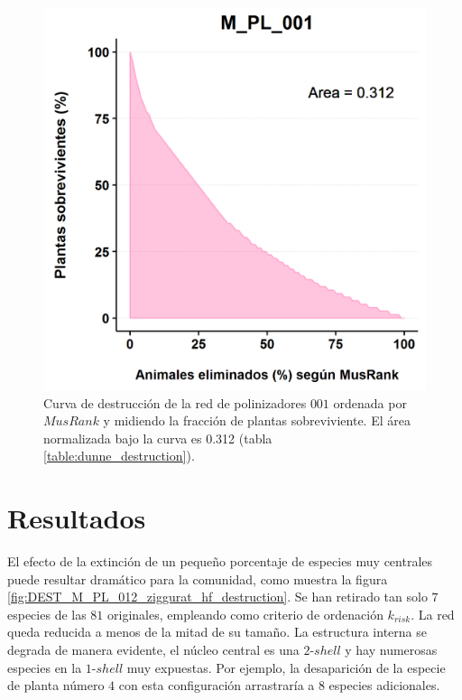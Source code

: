 \begin{figure}[h!]
\centering
\includegraphics[scale=1]{Figures/DEST_M_PL_001_MRdunne_extinction_plot.png}
\caption{Curva de destrucción de la red de polinizadores $001$ ordenada por $MusRank$ y midiendo la fracción de plantas sobreviviente. El área normalizada bajo la curva es 0.312 (tabla \ref{table:dunne_destruction}).}
\label{fig:DEST_M_PL_001_MRdunne_extinction_plot}
\end{figure}

\section{Resultados}

El efecto de la extinción de un pequeño porcentaje de especies muy centrales puede resultar dramático para la comunidad, como muestra la figura \ref{fig:DEST_M_PL_012_ziggurat_hf_destruction}. Se han retirado tan solo $7$ especies de las $81$ originales, empleando como criterio de ordenación ${k}_{risk}$. La red queda reducida a menos de la mitad de su tamaño. La estructura interna se degrada de manera evidente, el núcleo central es una $2$-$shell$ y hay numerosas especies en la $1$-$shell$ muy expuestas. Por ejemplo, la desaparición de la especie de planta número $4$ con esta configuración arrastraría a $8$ especies adicionales.

